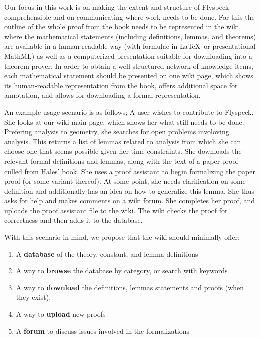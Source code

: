 Our focus in this work is on making the extent and structure of
Flyspeck comprehensible and on communicating where work needs to be
done.  For this the outline of the whole proof from the
book\cite{Hales:2007:FlyspeckBook} needs to be represented in the
wiki, where the mathematical statements (including definitions,
lemmas, and theorems) are available in a human-readable way (with
formulae in \LaTeX\ or presentational MathML) as well as a
computerized presentation suitable for downloading into a theorem
prover.  In order to obtain a well-structured network of knowledge
items, each mathematical statement should be presented on one wiki
page, which shows its human-readable representation from the book,
offers additional space for annotation, and allows for downloading a
formal representation.  

An example usage scenario is as follows;  A user
wishes to contribute to Flyspeck.  She looks at our wiki main page,
which shows her what still needs to be done.  Prefering analysis to
geometry, she searches for open problems involoving analysis.  This
returns a list of lemmas related to analysis from which she can
choose one that seems possible given her time constraints. She
downloads the relevant formal definitions and lemmas, along with the
text of a paper proof culled from Hales' book.  She uses a proof
assistant to begin formalizing the paper proof (or some variant
thereof).  At some point, she needs clarification on some definition and additionally
has an idea on how to generalize this lemma.  She thus asks for help
and makes comments on a wiki forum.  She completes her proof, and
uploads the proof assistant file to the wiki.  The wiki checks the proof
for correctness and then adds it to the database.

With this scenario in mind, we propose that the wiki should minimally offer: 

\begin{enumerate} 
\item A \textbf{database} of the theory, constant, and lemma definitions 
\item A way to \textbf{browse} the database by category, or search with keywords 
\item A way to \textbf{download} the definitions, lemmas statements and proofs (when they exist). 
\item A way to \textbf{upload} new proofs 
\item A \textbf{forum} to discuss issues involved in the formalizations 
\end{enumerate} 

